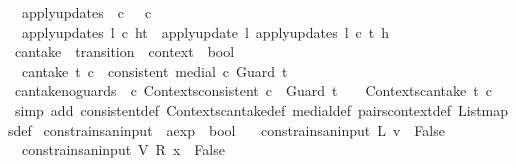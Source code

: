 \begin{isabellebody}
\ \ {\isachardoublequoteopen}apply{\isacharunderscore}updates\ {\isacharunderscore}\ c\ {\isacharbrackleft}{\isacharbrackright}\ {\isacharequal}\ c{\isachardoublequoteclose}\ {\isacharbar}\isanewline
\ \ {\isachardoublequoteopen}apply{\isacharunderscore}updates\ l\ c\ {\isacharparenleft}h{\isacharhash}t{\isacharparenright}\ {\isacharequal}\ {\isacharparenleft}apply{\isacharunderscore}update\ l\ {\isacharparenleft}apply{\isacharunderscore}updates\ l\ c\ t{\isacharparenright}\ h{\isacharparenright}{\isachardoublequoteclose}\isanewline
\isanewline
{}\isamarkupfalse%
\ can{\isacharunderscore}take\ {\isacharcolon}{\isacharcolon}\ {\isachardoublequoteopen}transition\ {\isasymRightarrow}\ context\ {\isasymRightarrow}\ bool{\isachardoublequoteclose}\ \isanewline
\ \ {\isachardoublequoteopen}can{\isacharunderscore}take\ t\ c\ {\isasymequiv}\ consistent\ {\isacharparenleft}medial\ c\ {\isacharparenleft}Guard\ t{\isacharparenright}{\isacharparenright}{\isachardoublequoteclose}\isanewline
\isanewline
{}\isamarkupfalse%
\ can{\isacharunderscore}take{\isacharunderscore}no{\isacharunderscore}guards{\isacharcolon}\ {\isachardoublequoteopen}{\isasymforall}\ c{\isachardot}\ {\isacharparenleft}Contexts{\isachardot}consistent\ c\ {\isasymand}\ {\isacharparenleft}Guard\ t{\isacharparenright}\ {\isacharequal}\ {\isacharbrackleft}{\isacharbrackright}{\isacharparenright}\ {\isasymlongrightarrow}\ Contexts{\isachardot}can{\isacharunderscore}take\ t\ c{\isachardoublequoteclose}\isanewline
%
\isadelimproof
\ \ %
\endisadelimproof
%
\isatagproof
{}\isamarkupfalse%
\ {\isacharparenleft}simp\ add{\isacharcolon}\ consistent{\isacharunderscore}def\ Contexts{\isachardot}can{\isacharunderscore}take{\isacharunderscore}def\ medial{\isacharunderscore}def\ pairs{}context{\isacharunderscore}def\ List{\isachardot}maps{\isacharunderscore}def{\isacharparenright}%
\endisatagproof
{\isafoldproof}%
%
\isadelimproof
\isanewline
%
\endisadelimproof
\isanewline
{}\isamarkupfalse%
\ constrains{\isacharunderscore}an{\isacharunderscore}input\ {\isacharcolon}{\isacharcolon}\ {\isachardoublequoteopen}aexp\ {\isasymRightarrow}\ bool{\isachardoublequoteclose}\ \isanewline
\ \ {\isachardoublequoteopen}constrains{\isacharunderscore}an{\isacharunderscore}input\ {\isacharparenleft}L\ v{\isacharparenright}\ {\isacharequal}\ False{\isachardoublequoteclose}\ {\isacharbar}\isanewline
\ \ {\isachardoublequoteopen}constrains{\isacharunderscore}an{\isacharunderscore}input\ {\isacharparenleft}V\ {\isacharparenleft}R\ x{\isacharparenright}{\isacharparenright}\ {\isacharequal}\ False{\isachardoublequoteclose}\ {\isacharbar}\isanewline

\end{isabellebody}
